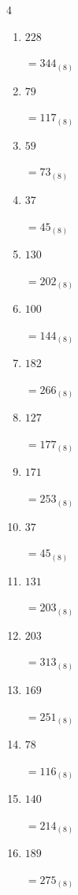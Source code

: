 \begin{multicols}{4}
\begin{enumerate}
        $=327_{(8)}$

  \item $228$

        $=344_{(8)}$

  \item $79$

        $=117_{(8)}$

  \item $59$

        $=73_{(8)}$

  \item $37$

        $=45_{(8)}$

  \item $130$

        $=202_{(8)}$

  \item $100$

        $=144_{(8)}$

  \item $182$

        $=266_{(8)}$

  \item $127$

        $=177_{(8)}$

  \item $171$

        $=253_{(8)}$

  \item $37$

        $=45_{(8)}$

\columnbreak %

  \item $131$

        $=203_{(8)}$

  \item $203$

        $=313_{(8)}$

  \item $169$

        $=251_{(8)}$

  \item $78$

        $=116_{(8)}$

  \item $140$

        $=214_{(8)}$

  \item $189$

        $=275_{(8)}$


\end{enumerate}
\end{multicols}
